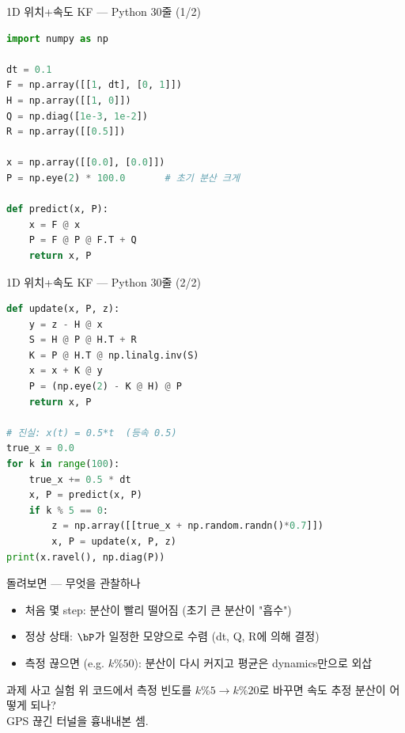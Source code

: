 \begin{frame}[fragile]{1D 위치+속도 KF — Python 30줄 (1/2)}
\begin{lstlisting}[language=Python]
import numpy as np

dt = 0.1
F = np.array([[1, dt], [0, 1]])
H = np.array([[1, 0]])
Q = np.diag([1e-3, 1e-2])
R = np.array([[0.5]])

x = np.array([[0.0], [0.0]])
P = np.eye(2) * 100.0       # 초기 분산 크게

def predict(x, P):
    x = F @ x
    P = F @ P @ F.T + Q
    return x, P
\end{lstlisting}
\end{frame}

\begin{frame}[fragile]{1D 위치+속도 KF — Python 30줄 (2/2)}
\begin{lstlisting}[language=Python]
def update(x, P, z):
    y = z - H @ x
    S = H @ P @ H.T + R
    K = P @ H.T @ np.linalg.inv(S)
    x = x + K @ y
    P = (np.eye(2) - K @ H) @ P
    return x, P

# 진실: x(t) = 0.5*t  (등속 0.5)
true_x = 0.0
for k in range(100):
    true_x += 0.5 * dt
    x, P = predict(x, P)
    if k % 5 == 0:
        z = np.array([[true_x + np.random.randn()*0.7]])
        x, P = update(x, P, z)
print(x.ravel(), np.diag(P))
\end{lstlisting}
\end{frame}

\begin{frame}{돌려보면 — 무엇을 관찰하나}
  \begin{itemize}
    \item 처음 몇 step: 분산이 빨리 떨어짐 (초기 큰 분산이 "흡수")
    \item 정상 상태: $\bP$가 일정한 모양으로 수렴 (dt, Q, R에 의해 결정)
    \item 측정 끊으면 (e.g. $k\%50$): 분산이 다시 커지고 평균은 dynamics만으로 외삽
  \end{itemize}
  \pause
  \vspace{0.3em}
  \begin{block}{과제 사고 실험}
    위 코드에서 측정 빈도를 $k\%5 \to k\%20$로 바꾸면 속도 추정 분산이 어떻게 되나? \\
    GPS 끊긴 터널을 흉내내본 셈.
  \end{block}
\end{frame}

